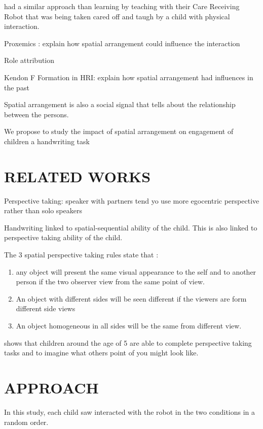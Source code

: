 \documentclass[letterpaper, 10 pt, conference]{ieeeconf}  %
\begin{document}
\cite{Matsuzoe2012} had a similar approach than learning by teaching with their Care Receiving Robot that was being taken cared off and taugh by a child with physical interaction. 



Proxemics : explain how spatial arrangement could influence the interaction

Role attribution

Kendon F Formation in HRI: explain how spatial arrangement had influences in the past

Spatial arrangement is also a social signal that tells about the relationship between the persons.



\cite{huttenrauch2006investigating}

We propose to study the impact of spatial arrangement on engagement of children a handwriting task


\section{RELATED WORKS}


Perspective taking: speaker with partners tend yo use more egocentric perspective rather than solo speakers \cite{Schober} 

Handwriting linked to spatial-sequential ability of the child. 
This is also linked to perspective taking ability of the child. 

The 3 spatial perspective taking rules state that :
\begin{enumerate}
\item any object will present the same visual appearance to the self and to another person if the two observer view from the same point of view.
\item An object with different sides will be seen different if the viewers are form different side views
\item An object homogeneous in all sides will be the same from different view. 
\end{enumerate}




\cite{Newcombe1992} shows that children around the age of 5 are able to complete perspective taking tasks and to imagine what others point of you might look like.




\section{APPROACH}
In this study, each child saw interacted with the robot in the two conditions in a random order. 
\end{document}
